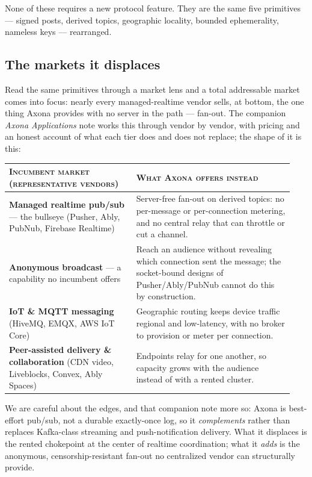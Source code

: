 \documentclass[nobib,justified]{tufte-handout}
\begin{document}
None of these requires a new protocol feature. They are the same five primitives --- signed posts, derived topics, geographic locality, bounded ephemerality, nameless keys --- rearranged.

\subsection{The markets it displaces}

Read the same primitives through a market lens and a total addressable market comes into focus: nearly every managed-realtime vendor sells, at bottom, the one thing Axona provides with no server in the path --- fan-out. The companion \emph{Axona Applications} note works this through vendor by vendor, with pricing and an honest account of what each tier does and does not replace; the shape of it is this:

\begin{table}[h]
\small
\begin{tabular}{@{}p{0.42\linewidth}p{0.52\linewidth}@{}}
\toprule
\textsc{Incumbent market (representative vendors)} & \textsc{What Axona offers instead} \\
\midrule
\textbf{Managed realtime pub/sub} --- the bullseye (Pusher, Ably, PubNub, Firebase Realtime) & Server-free fan-out on derived topics: no per-message or per-connection metering, and no central relay that can throttle or cut a channel. \\
\textbf{Anonymous broadcast} --- a capability no incumbent offers & Reach an audience without revealing which connection sent the message; the socket-bound designs of Pusher/Ably/PubNub cannot do this by construction. \\
\textbf{IoT \& MQTT messaging} (HiveMQ, EMQX, AWS IoT Core) & Geographic routing keeps device traffic regional and low-latency, with no broker to provision or meter per connection. \\
\textbf{Peer-assisted delivery \& collaboration} (CDN video, Liveblocks, Convex, Ably Spaces) & Endpoints relay for one another, so capacity grows with the audience instead of with a rented cluster. \\
\bottomrule
\end{tabular}
\end{table}

We are careful about the edges, and that companion note more so: Axona is best-effort pub/sub, not a durable exactly-once log, so it \emph{complements} rather than replaces Kafka-class streaming and push-notification delivery. What it displaces is the rented chokepoint at the center of realtime coordination; what it \emph{adds} is the anonymous, censorship-resistant fan-out no centralized vendor can structurally provide.
\end{document}
